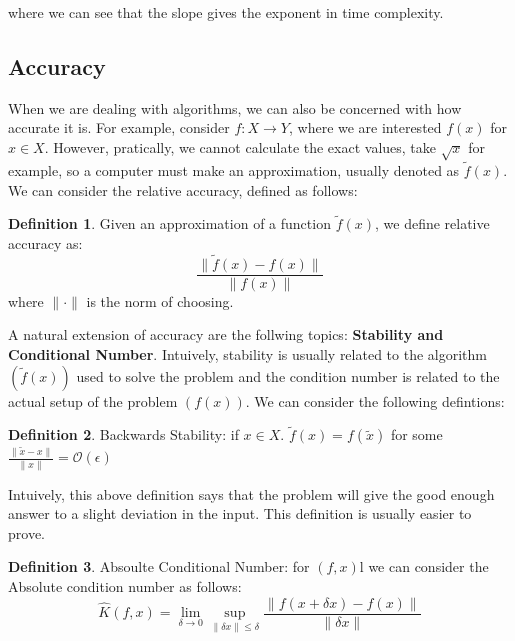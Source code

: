 \documentclass[11pt]{article}
\theoremstyle{definition}
\newtheorem{definition}{Definition}[section]
\begin{document}
\begin{center}

\end{center}
where we can see that the slope gives the exponent in time complexity. 
\subsection{Accuracy} 
When we are dealing with algorithms, we can also be concerned with how accurate it is. For example, consider $f: X \to Y$, where we are interested $f(x)$ for $x \in X$. However, pratically, we cannot calculate the exact values, take $\sqrt{x}$ for example, so a computer must make an approximation, usually denoted as $\tilde{f}(x)$. We can consider the relative accuracy, defined as follows:
\begin{definition}
  Given an approximation of a function $\tilde{f}(x)$, we define relative accuracy as:
  \[
  \frac{\|\tilde{f}(x) - f(x)\|}{\|f(x)\|}
  \]
  where $\| \cdot \|$ is the norm of choosing. 
\end{definition}
A natural extension of accuracy are the follwing topics: \textbf{Stability and Conditional Number}. Intuively, stability is usually related to the algorithm $(\tilde{f}(x))$ used to solve the problem and the condition number is related to the actual setup of the problem $(f(x))$. We can consider the following defintions:
\begin{definition}
  Backwards Stability: if $x \in X$. $\tilde{f}(x) = f(\tilde{x})$ for some $\frac{\| \tilde{x} - x \|}{\|x\|} = \mathcal{O}(\epsilon)$
\end{definition}
Intuively, this above definition says that the problem will give the good enough answer to a slight deviation in the input. This definition is usually easier to prove. 
\begin{definition}
  Absoulte Conditional Number: for $(f, x)$l we can consider the Absolute condition number as follows:
  \[
  \hat{K}(f, x) = \lim_{\delta \to 0} \sup_{\|\delta x \| \leq \delta} \frac{\|f(x+\delta x) -f(x)\|}{\|\delta x\|} 
  \]
\end{definition}
\end{document}
